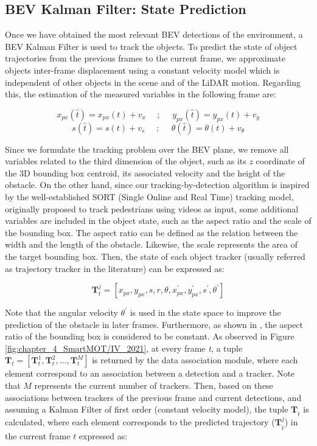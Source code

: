 \subsection{BEV Kalman Filter: State Prediction}
\label{subsec:4_smartmot_state_prediction}

Once we have obtained the most relevant \ac{BEV} detections of the environment, a \ac{BEV} Kalman Filter is used to track the objects. To predict the state of object trajectories from the previous frames to the current frame, we approximate objects inter-frame displacement using a constant velocity model which is independent of other objects in the scene and of the LiDAR motion. Regarding this, the estimation of the measured variables in the following frame are:

\[
x_{px}(\hat{t})=x_{px}(t)+v_{x} \:\:\:\:\:\: ; \:\:\:\:\:\: y_{px}(\hat{t})=y_{px}(t)+v_{y}\]
\[
s(\hat{t})=s(t)+v_{s} \:\:\:\:\:\: ; \:\:\:\:\:\: 
\theta(\hat{t})=\theta(t)+v_{\theta}\]

Since we formulate the tracking problem over the \ac{BEV} plane, we remove all variables related to the third dimension of the object, such as its $\textit{z}$ coordinate of the 3D bounding box centroid, its associated velocity and the height of the obstacle. On the other hand, since our tracking-by-detection algorithm is inspired by the well-established SORT (Single Online and Real Time) \cite{bewley2016simple} tracking model, originally proposed to track pedestrians using videos as input, some additional variables are included in the object state, such as the aspect ratio and the scale of the bounding box. The aspect ratio can be defined as the relation between the width and the length of the obstacle. Likewise, the scale represents the area of the target bounding box. Then, the state of each object tracker (usually referred as trajectory tracker in the literature) can be expressed as:

\begin{equation}
	\label{state}
	\textbf{T}_{t}^{j} = [x_{px},y_{px},s,r,\theta,x_{px}^{'},y_{px}^{'},s^{'},\theta^{'}]
\end{equation}

Note that the angular velocity $\theta^{'}$ is used in the state space to improve the prediction of the obstacle in later frames. Furthermore, as shown in \cite{bewley2016simple}, the aspect ratio of the bounding box is considered to be constant. As observed in Figure \ref{fig:chapter_4_SmartMOT/IV_2021}, at every frame \textit{t}, a tuple $\textbf{T}_{t}=[\textbf{T}_{t}^{1},\textbf{T}_{t}^{2}, ...,\textbf{T}_{t}^{M}]$ is returned by the data association module, where each element correspond to an association between a detection and a tracker. Note that $M$ represents the current number of trackers. Then, based on these associations between trackers of the previous frame and current detections, and assuming a Kalman Filter of first order (constant velocity model), the tuple $\textbf{T}_{\hat{t}}$ is calculated, where each element corresponds to the predicted trajectory ($\textbf{T}_{\hat{t}}^{j}$) in the current frame $\textit{t}$ expressed as:

